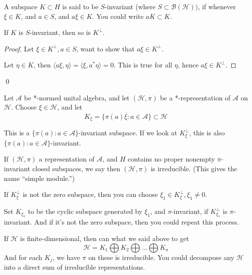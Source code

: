 \begin{definition}
    A subspace $K\subset H$ is said to be $S$-invariant (where $S\subset\mathcal{B}(\mathcal{H}))$, if whenever $\xi\in K$, and $a\in S$, and $a\xi\in K$. You could write $aK\subset K$.
\end{definition}

\begin{proposition}
    If $K$ is $S$-invariant, then so is $K^\perp$.
\end{proposition}
\begin{proof}
    Let $\xi\in K^\perp, a\in S$, want to show that $a\xi\in K^\perp$.

    Let $\eta\in K$, then $\langle a\xi, \eta\rangle=\langle \xi, a^*\eta\rangle =0$. This is true for all $\eta$, hence $a\xi\in K^\perp$.
\end{proof}
\qed

Let $\mathcal{A}$ be *-normed unital algebra, and let $(\mathcal{H}, \pi)$ be a *-representation of $\mathcal{A}$ on $\mathcal{H}$. Choose $\xi\in\mathcal{H}$, and let 
\begin{equation*}
    K_\xi=\overline{\{\pi(a)\xi: a\in\mathcal{A}\}}\subset\mathcal{H}
\end{equation*}

This is a $\{\pi(a): a\in\mathcal{A}\}$-invariant subspace. If we look at $K_\xi^\perp$, this is also $\{\pi(a):a\in\mathcal{A}\}$-invariant. 

\begin{definition}
    If $(\mathcal{H}, \pi)$ a representation of $\mathcal{A}$, and $H$ contains no proper nonempty $\pi$-invariant closed subspaces, we say then $(\mathcal{H}, \pi)$ is irreducible. (This gives the name ``simple module.'')
\end{definition}

If $K_\xi^\perp$ is not the zero subspace, then you can choose $\xi_1\in K_\xi^\perp, \xi_1\neq 0$.

Set $K_{\xi_1}$ to be the cyclic subspace generated by $\xi_1$, and $\pi$-invariant, if $K_{\xi_1}^\perp$ is $\pi$-invariant. And if it's not the zero subspace, then you could repeat this process.

If $\mathcal{H}$ is finite-dimensional, then can what we said above to get 
\begin{equation*}
    \mathcal{H}=K_1\bigoplus K_2\bigoplus... \bigoplus K_n
\end{equation*}
And for each $K_j$, we have $\pi$ on these is irreducible. You could decompose any $\mathcal{H}$ into a direct sum of irreducible representations. 

